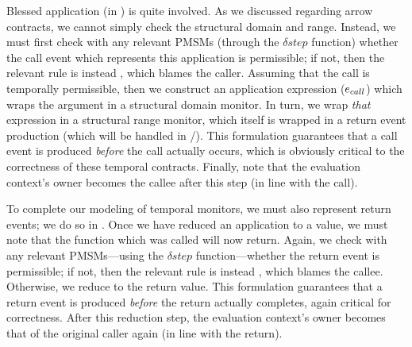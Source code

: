 %
Blessed application (in ) is quite involved.
%
As we discussed regarding arrow contracts, we cannot simply check the structural domain and range.
%
Instead, we must first check with any relevant PMSMs (through the $\delta{}step$ function) whether the call event which represents this application is permissible; if not, then the relevant rule is instead , which blames the caller.
%
Assuming that the call is temporally permissible, then we construct an application expression ($e_{call}$) which wraps the argument in a structural domain monitor.
%
In turn, we wrap \emph{that} expression in a structural range monitor, which itself is wrapped in a return event production (which will be handled in /).
%
This formulation guarantees that a call event is produced \emph{before} the call actually occurs, which is obviously critical to the correctness of these temporal contracts.
%
Finally, note that the evaluation context's owner becomes the callee after this step (in line with the call).
%

%
To complete our modeling of temporal monitors, we must also represent return events; we do so in .
%
Once we have reduced an application to a value, we must note that the function which was called will now return.
%
Again, we check with any relevant PMSMs---using the $\delta{}step$ function---whether the return event is permissible; if not, then the relevant rule is instead , which blames the callee.
%
Otherwise, we reduce to the return value.
%
This formulation guarantees that a return event is produced \emph{before} the return actually completes, again critical for correctness.
%
After this reduction step, the evaluation context's owner becomes that of the original caller again (in line with the return).
%